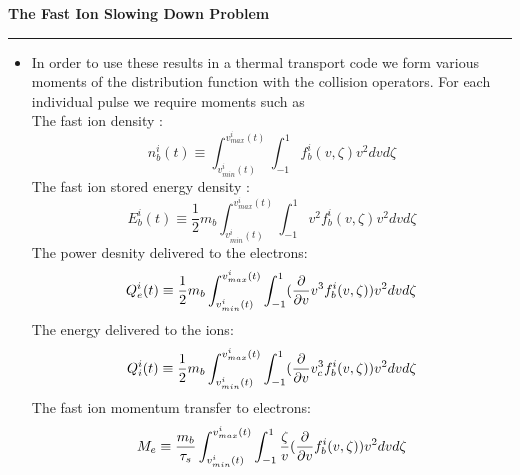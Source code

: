 


     \begin{slide}          \setlength{\topmargin}{-0.5in}
       \begin{center}
           \Large\bfseries The Fast Ion Slowing Down Problem 
        \end{center}
        \normalsize  

        \bigskip
        \hrule height4pt

         \begin{itemize} \bfseries \tiny
           \item
            In order to use these results in a thermal transport code
            we form various moments of the distribution function with 
            the collision operators. For each individual pulse we
            require moments such as  \\
            The fast ion density :
         \begin{equation}
             n_b^i(t) \equiv \int_{v_{min}^i(t)}^{v_{max}^i(t)}
                       \int_{-1}^{1} 
                     f_b^i(v,\zeta)
             v^2dvd\zeta   
        \label{eq:wav5a}
        \end{equation}
           The fast ion stored energy density :
         \begin{equation}
             E_b^i(t) \equiv \frac{1}{2}m_b\int_{v_{min}^i(t)}^{v_{max}^i(t)}
                       \int_{-1}^{1} 
                      v^2 f_b^i(v,\zeta)
             v^2dvd\zeta   
        \label{eq:wav5b}
        \end{equation}
           The power desnity  delivered to the electrons:
         \begin{equation}
             Q_e^i(t) \equiv \frac{1}{2}m_b\int_{v_{min}^i(t)}^{v_{max}^i(t)}
                       \int_{-1}^{1} 
                   (\frac{\partial}{\partial v}{v^3 f_b^i(v,\zeta)})
             v^2dvd\zeta   
        \label{eq:wav5c}
        \end{equation}
           The energy delivered to the ions:
         \begin{equation}
             Q_i^i(t) 
                    \equiv \frac{1}{2}m_b \int_{v_{min}^i(t)}^{v_{max}^i(t)}
                       \int_{-1}^{1} 
                    (\frac{\partial}{\partial v}{v_c^3 f_b^i(v,\zeta)})
             v^2dvd\zeta   
        \label{eq:wav5d}
        \end{equation}
           The fast ion momentum transfer to electrons:
         \begin{equation}
             M_e \equiv \frac{m_b}{\tau_s}\int_{v_{min}^i(t)}^{v_{max}^i(t)}
                       \int_{-1}^{1} 
                    \frac{\zeta}{v}(\frac{\partial}{\partial v} f_b^i(v,\zeta))
             v^2dvd\zeta   
        \label{eq:wav5e}
        \end{equation}
    \end{itemize}
    \end{slide}





